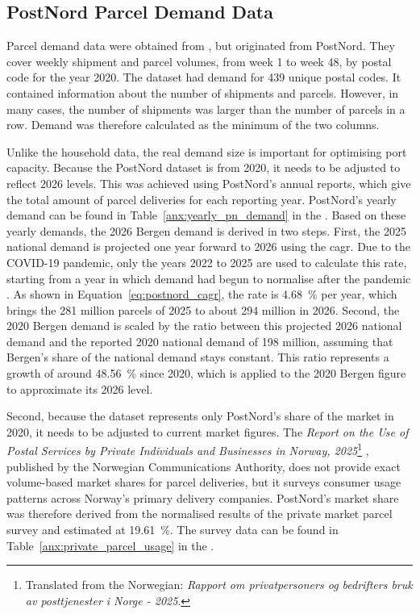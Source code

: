 \documentclass[12pt]{article}
\begin{document}
\subsection{PostNord Parcel Demand Data}
\label{subsec:postnord-parcel-demand-data}

Parcel demand data were obtained from \textcite{household}, but originated from PostNord. They cover weekly shipment and parcel volumes, from week \num{1} to week \num{48}, by postal code for the year 2020. The dataset had demand for \num{439} unique postal codes. It contained information about the number of shipments and parcels. However, in many cases, the number of shipments was larger than the number of parcels in a row. Demand was therefore calculated as the minimum of the two columns.

Unlike the household data, the real demand size is important for optimising port capacity. Because the PostNord dataset is from 2020, it needs to be adjusted to reflect 2026 levels. This was achieved using PostNord's annual reports, which give the total amount of parcel deliveries for each reporting year. PostNord's yearly demand can be found in Table~\ref{anx:yearly_pn_demand} in the . Based on these yearly demands, the 2026 Bergen demand is derived in two steps. First, the 2025 national demand is projected one year forward to 2026 using the \ac{cagr}. Due to the COVID-19 pandemic, only the years 2022 to 2025 are used to calculate this rate, starting from a year in which demand had begun to normalise after the pandemic \parencite{pitney_bowes_index_2023}. As shown in Equation~\ref{eq:postnord_cagr}, the rate is \qty{4.68}{\percent} per year, which brings the \num{281} million parcels of 2025 to about \num{294} million in 2026. Second, the 2020 Bergen demand is scaled by the ratio between this projected 2026 national demand and the reported 2020 national demand of \num{198} million, assuming that Bergen's share of the national demand stays constant. This ratio represents a growth of around \qty{48.56}{\percent} since 2020, which is applied to the 2020 Bergen figure to approximate its 2026 level.

Second, because the dataset represents only PostNord's share of the market in 2020, it needs to be adjusted to current market figures. The \textit{Report on the Use of Postal Services by Private Individuals and Businesses in Norway, 2025}\footnote{Translated from the Norwegian: \textit{Rapport om privatpersoners og bedrifters bruk av posttjenester i Norge - 2025}.} \parencite{nkom_post_2025}, published by the Norwegian Communications Authority, does not provide exact volume-based market shares for parcel deliveries, but it surveys consumer usage patterns across Norway's primary delivery companies. PostNord's market share was therefore derived from the normalised results of the private market parcel survey and estimated at \qty{19.61}{\percent}. The survey data can be found in Table~\ref{anx:private_parcel_usage} in the .
\end{document}
